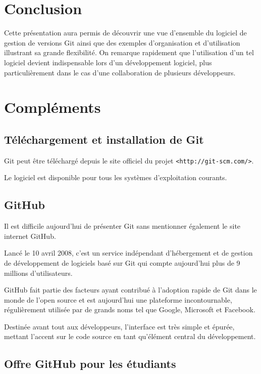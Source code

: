 \documentclass[11pt,a4paper]{article}
\begin{document}
\section{Conclusion}

Cette présentation aura permis de découvrir une vue d'ensemble du logiciel de gestion de versions Git ainsi que des exemples d'organisation et d'utilisation illustrant sa grande flexibilité. On remarque rapidement que l'utilisation d'un tel logiciel devient indispensable lors d'un développement logiciel, plus particulièrement dans le cas d'une collaboration de plusieurs développeurs.

\pagebreak
{}
\section{Compléments}

\subsection{Téléchargement et installation de Git}

Git peut être téléchargé depuis le site officiel du projet {\tt <http://git-scm.com/>}.

Le logiciel est disponible pour tous les systèmes d'exploitation courants.

\subsection{GitHub}

Il est difficile aujourd'hui de présenter Git sans mentionner également le site internet GitHub.

Lancé le 10 avril 2008, c'est un service indépendant d'hébergement et de gestion de développement de logiciels basé sur Git qui compte aujourd'hui plus de 9 millions d'utilisateurs.

GitHub fait partie des facteurs ayant contribué à l'adoption rapide de Git dans le monde de l'open source et est aujourd'hui une plateforme incontournable, régulièrement utilisée par de grands noms tel que Google, Microsoft et Facebook. 

Destinée avant tout aux développeurs, l'interface est très simple et épurée, mettant l'accent sur le code source en tant qu'élément central du développement.

\subsection{Offre GitHub pour les étudiants}
\end{document}
